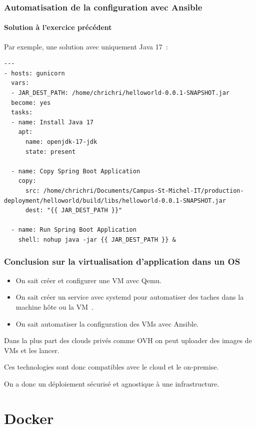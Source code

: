 \documentclass{beamer}
\begin{document}
    \begin{frame}[fragile]
        \transdissolve
        \frametitle{Automatisation de la configuration avec Ansible}
        \framesubtitle{Solution à l'exercice précédent}
        Par exemple, une solution avec uniquement Java 17~:
        \begin{lstlisting}[basicstyle=\ttfamily\tiny]
---
- hosts: gunicorn
  vars:
  - JAR_DEST_PATH: /home/chrichri/helloworld-0.0.1-SNAPSHOT.jar
  become: yes
  tasks:
  - name: Install Java 17
    apt:
      name: openjdk-17-jdk
      state: present

  - name: Copy Spring Boot Application
    copy:
      src: /home/chrichri/Documents/Campus-St-Michel-IT/production-deployment/helloworld/build/libs/helloworld-0.0.1-SNAPSHOT.jar
      dest: "{{ JAR_DEST_PATH }}"

  - name: Run Spring Boot Application
    shell: nohup java -jar {{ JAR_DEST_PATH }} &
        \end{lstlisting}
    \end{frame}


    \begin{frame}
        \transdissolve
        \frametitle{Conclusion sur la virtualisation d'application dans un OS}
        \begin{itemize}
            \item On sait créer et configurer une VM avec Qemu.
            \item On sait créer un service avec systemd pour automatiser des taches dans la machine hôte ou la VM~.
            \item On sait automatiser la configuration des VMs avec Ansible.
        \end{itemize}
        \bigbreak
        Dans la plus part des clouds privés comme OVH on peut uploader des images de VMs et les lancer.

        Ces technologies sont donc compatibles avec le cloud et le on-premise.

        On a donc un déploiement sécurisé et agnostique à une infrastructure.
    \end{frame}


    \section{Docker}\label{sec:docker}
\end{document}
